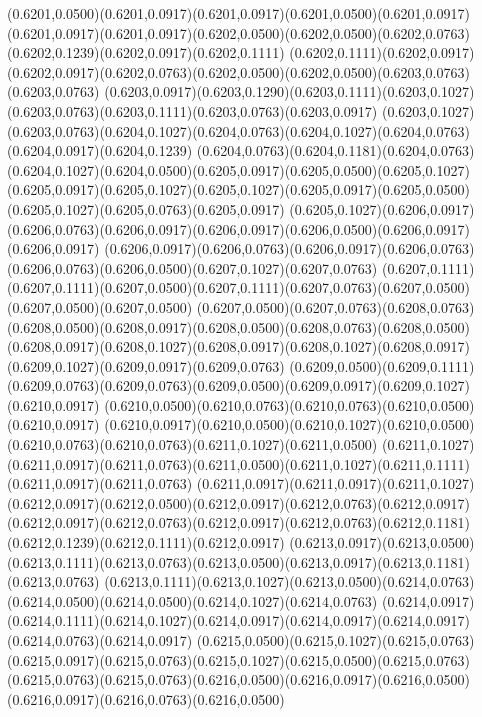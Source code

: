(0.6201,0.0500)(0.6201,0.0917)(0.6201,0.0917)(0.6201,0.0500)(0.6201,0.0917)
\PST@Solid(0.6201,0.0917)(0.6201,0.0917)(0.6202,0.0500)(0.6202,0.0500)(0.6202,0.0763)(0.6202,0.1239)(0.6202,0.0917)(0.6202,0.1111)
(0.6202,0.1111)(0.6202,0.0917)(0.6202,0.0917)(0.6202,0.0763)(0.6202,0.0500)(0.6202,0.0500)(0.6203,0.0763)(0.6203,0.0763)
(0.6203,0.0917)(0.6203,0.1290)(0.6203,0.1111)(0.6203,0.1027)(0.6203,0.0763)(0.6203,0.1111)(0.6203,0.0763)(0.6203,0.0917)
(0.6203,0.1027)(0.6203,0.0763)(0.6204,0.1027)(0.6204,0.0763)(0.6204,0.1027)(0.6204,0.0763)(0.6204,0.0917)(0.6204,0.1239)
(0.6204,0.0763)(0.6204,0.1181)(0.6204,0.0763)(0.6204,0.1027)(0.6204,0.0500)(0.6205,0.0917)(0.6205,0.0500)(0.6205,0.1027)
(0.6205,0.0917)(0.6205,0.1027)(0.6205,0.1027)(0.6205,0.0917)(0.6205,0.0500)(0.6205,0.1027)(0.6205,0.0763)(0.6205,0.0917)
(0.6205,0.1027)(0.6206,0.0917)(0.6206,0.0763)(0.6206,0.0917)(0.6206,0.0917)(0.6206,0.0500)(0.6206,0.0917)(0.6206,0.0917)
(0.6206,0.0917)(0.6206,0.0763)(0.6206,0.0917)(0.6206,0.0763)(0.6206,0.0763)(0.6206,0.0500)(0.6207,0.1027)(0.6207,0.0763)
(0.6207,0.1111)(0.6207,0.1111)(0.6207,0.0500)(0.6207,0.1111)(0.6207,0.0763)(0.6207,0.0500)(0.6207,0.0500)(0.6207,0.0500)
(0.6207,0.0500)(0.6207,0.0763)(0.6208,0.0763)(0.6208,0.0500)(0.6208,0.0917)(0.6208,0.0500)(0.6208,0.0763)(0.6208,0.0500)
(0.6208,0.0917)(0.6208,0.1027)(0.6208,0.0917)(0.6208,0.1027)(0.6208,0.0917)(0.6209,0.1027)(0.6209,0.0917)(0.6209,0.0763)
(0.6209,0.0500)(0.6209,0.1111)(0.6209,0.0763)(0.6209,0.0763)(0.6209,0.0500)(0.6209,0.0917)(0.6209,0.1027)(0.6210,0.0917)
(0.6210,0.0500)(0.6210,0.0763)(0.6210,0.0763)(0.6210,0.0500)(0.6210,0.0917)
\PST@Solid(0.6210,0.0917)(0.6210,0.0500)(0.6210,0.1027)(0.6210,0.0500)(0.6210,0.0763)(0.6210,0.0763)(0.6211,0.1027)(0.6211,0.0500)
(0.6211,0.1027)(0.6211,0.0917)(0.6211,0.0763)(0.6211,0.0500)(0.6211,0.1027)(0.6211,0.1111)(0.6211,0.0917)(0.6211,0.0763)
(0.6211,0.0917)(0.6211,0.0917)(0.6211,0.1027)(0.6212,0.0917)(0.6212,0.0500)(0.6212,0.0917)(0.6212,0.0763)(0.6212,0.0917)
(0.6212,0.0917)(0.6212,0.0763)(0.6212,0.0917)(0.6212,0.0763)(0.6212,0.1181)(0.6212,0.1239)(0.6212,0.1111)(0.6212,0.0917)
(0.6213,0.0917)(0.6213,0.0500)(0.6213,0.1111)(0.6213,0.0763)(0.6213,0.0500)(0.6213,0.0917)(0.6213,0.1181)(0.6213,0.0763)
(0.6213,0.1111)(0.6213,0.1027)(0.6213,0.0500)(0.6214,0.0763)(0.6214,0.0500)(0.6214,0.0500)(0.6214,0.1027)(0.6214,0.0763)
(0.6214,0.0917)(0.6214,0.1111)(0.6214,0.1027)(0.6214,0.0917)(0.6214,0.0917)(0.6214,0.0917)(0.6214,0.0763)(0.6214,0.0917)
(0.6215,0.0500)(0.6215,0.1027)(0.6215,0.0763)(0.6215,0.0917)(0.6215,0.0763)(0.6215,0.1027)(0.6215,0.0500)(0.6215,0.0763)
(0.6215,0.0763)(0.6215,0.0763)(0.6216,0.0500)(0.6216,0.0917)(0.6216,0.0500)(0.6216,0.0917)(0.6216,0.0763)(0.6216,0.0500)
